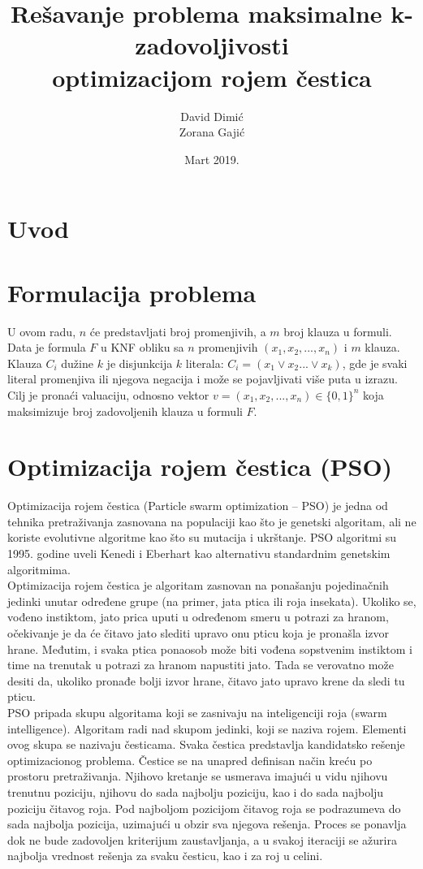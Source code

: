 \documentclass{article}
\title{Rešavanje problema maksimalne k-zadovoljivosti\\ optimizacijom rojem čestica}
\author{David Dimić\\ Zorana Gajić}
\date{Mart 2019.}
\begin{document}
\maketitle  
\newpage
\tableofcontents
\newpage

\section{Uvod}
\section{Formulacija problema}
U ovom radu, $n$  će predstavljati broj promenjivih, a $m$ broj klauza u formuli. Data je formula $F$ u KNF obliku sa $n$ promenjivih $(x_1, x_2, ..., x_n)$ i $m$ klauza. \\ 

Klauza $C_i$ dužine $k$ je disjunkcija $k$ literala: 
$C_i = (x_1  \vee x_2 ... \vee x_k)$, gde je svaki literal promenjiva ili njegova negacija i može se pojavljivati više puta u izrazu.
Cilj je pronaći valuaciju, odnosno vektor $v = (x_1, x_2, ..., x_n) \in \{ 0,1 \}^n$ koja maksimizuje broj zadovoljenih klauza u formuli $F$.


\section{Optimizacija rojem čestica (PSO)}
Optimizacija rojem čestica (Particle swarm optimization – PSO) je jedna od tehnika pretraživanja zasnovana na populaciji kao što je genetski algoritam, ali ne koriste evolutivne algoritme kao što su mutacija i ukrštanje.
PSO algoritmi su 1995. godine uveli Kenedi i Eberhart kao alternativu standardnim genetskim algoritmima. \\

Optimizacija rojem čestica je algoritam zasnovan na ponašanju pojedinačnih jedinki unutar određene grupe (na primer, jata ptica ili roja insekata). Ukoliko se, vođeno instiktom, jato prica uputi u određenom smeru u potrazi za hranom, očekivanje je da će čitavo jato slediti upravo onu pticu koja je pronašla izvor hrane. Međutim, i svaka ptica ponaosob može biti vođena sopstvenim instiktom i time na trenutak u potrazi za hranom napustiti jato. Tada se verovatno može desiti da, ukoliko pronađe bolji izvor hrane, čitavo jato upravo krene da sledi tu pticu. \\

PSO pripada skupu algoritama koji se zasnivaju na inteligenciji roja (swarm intelligence). Algoritam radi nad skupom jedinki, koji se naziva rojem. Elementi ovog skupa se nazivaju česticama. 
Svaka čestica predstavlja kandidatsko rešenje optimizacionog problema. Čestice se na unapred definisan način kreću po prostoru pretraživanja. Njihovo kretanje se usmerava imajući u vidu njihovu trenutnu poziciju, njihovu do sada najbolju poziciju, kao i do sada najbolju poziciju čitavog roja. Pod najboljom pozicijom čitavog roja se podrazumeva do sada najbolja pozicija, uzimajući u obzir sva njegova rešenja. Proces se ponavlja dok ne bude zadovoljen kriterijum zaustavljanja, a u svakoj iteraciji se ažurira najbolja vrednost rešenja za svaku česticu, kao i za roj u celini. \\
\end{document}
